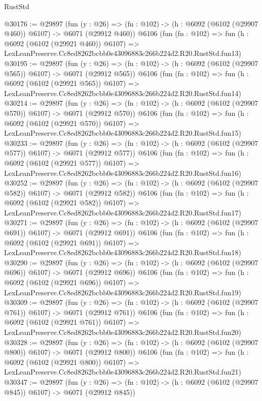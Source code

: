 \begin{lexlean}{RustStd}
\begin{coremodule}
@30176 := @29897
    (fun (y : @26) => (fn : @102) -> (h : @6092 (@6102 (@29907 @460)) @6107) -> @6071 (@29912 @460))
    @6106
    (fun (fn : @102) =>
    fun (h : @6092 (@6102 (@29921 @460)) @6107) =>
    LexLeanPreserve.Cc8ed8262bcbb0e43096883c266b224d2.R20.RustStd.fun13)
@30195 := @29897
    (fun (y : @26) => (fn : @102) -> (h : @6092 (@6102 (@29907 @565)) @6107) -> @6071 (@29912 @565))
    @6106
    (fun (fn : @102) =>
    fun (h : @6092 (@6102 (@29921 @565)) @6107) =>
    LexLeanPreserve.Cc8ed8262bcbb0e43096883c266b224d2.R20.RustStd.fun14)
@30214 := @29897
    (fun (y : @26) => (fn : @102) -> (h : @6092 (@6102 (@29907 @570)) @6107) -> @6071 (@29912 @570))
    @6106
    (fun (fn : @102) =>
    fun (h : @6092 (@6102 (@29921 @570)) @6107) =>
    LexLeanPreserve.Cc8ed8262bcbb0e43096883c266b224d2.R20.RustStd.fun15)
@30233 := @29897
    (fun (y : @26) => (fn : @102) -> (h : @6092 (@6102 (@29907 @577)) @6107) -> @6071 (@29912 @577))
    @6106
    (fun (fn : @102) =>
    fun (h : @6092 (@6102 (@29921 @577)) @6107) =>
    LexLeanPreserve.Cc8ed8262bcbb0e43096883c266b224d2.R20.RustStd.fun16)
@30252 := @29897
    (fun (y : @26) => (fn : @102) -> (h : @6092 (@6102 (@29907 @582)) @6107) -> @6071 (@29912 @582))
    @6106
    (fun (fn : @102) =>
    fun (h : @6092 (@6102 (@29921 @582)) @6107) =>
    LexLeanPreserve.Cc8ed8262bcbb0e43096883c266b224d2.R20.RustStd.fun17)
@30271 := @29897
    (fun (y : @26) => (fn : @102) -> (h : @6092 (@6102 (@29907 @691)) @6107) -> @6071 (@29912 @691))
    @6106
    (fun (fn : @102) =>
    fun (h : @6092 (@6102 (@29921 @691)) @6107) =>
    LexLeanPreserve.Cc8ed8262bcbb0e43096883c266b224d2.R20.RustStd.fun18)
@30290 := @29897
    (fun (y : @26) => (fn : @102) -> (h : @6092 (@6102 (@29907 @696)) @6107) -> @6071 (@29912 @696))
    @6106
    (fun (fn : @102) =>
    fun (h : @6092 (@6102 (@29921 @696)) @6107) =>
    LexLeanPreserve.Cc8ed8262bcbb0e43096883c266b224d2.R20.RustStd.fun19)
@30309 := @29897
    (fun (y : @26) => (fn : @102) -> (h : @6092 (@6102 (@29907 @761)) @6107) -> @6071 (@29912 @761))
    @6106
    (fun (fn : @102) =>
    fun (h : @6092 (@6102 (@29921 @761)) @6107) =>
    LexLeanPreserve.Cc8ed8262bcbb0e43096883c266b224d2.R20.RustStd.fun20)
@30328 := @29897
    (fun (y : @26) => (fn : @102) -> (h : @6092 (@6102 (@29907 @800)) @6107) -> @6071 (@29912 @800))
    @6106
    (fun (fn : @102) =>
    fun (h : @6092 (@6102 (@29921 @800)) @6107) =>
    LexLeanPreserve.Cc8ed8262bcbb0e43096883c266b224d2.R20.RustStd.fun21)
@30347 := @29897
    (fun (y : @26) => (fn : @102) -> (h : @6092 (@6102 (@29907 @845)) @6107) -> @6071 (@29912 @845))

\end{coremodule}
\end{lexlean}
